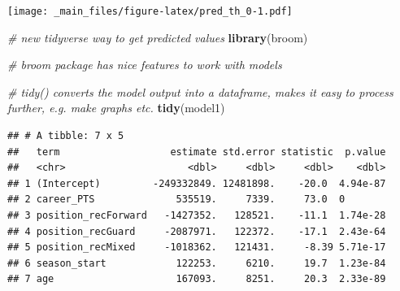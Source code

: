 \documentclass[
]{book}
\newenvironment{Shaded}{\begin{snugshade}}{\end{snugshade}}
\newcommand{\AttributeTok}[1]{\textcolor[rgb]{0.13,0.29,0.53}{#1}}
\newcommand{\CommentTok}[1]{\textcolor[rgb]{0.56,0.35,0.01}{\textit{#1}}}
\newcommand{\FunctionTok}[1]{\textcolor[rgb]{0.13,0.29,0.53}{\textbf{#1}}}
\newcommand{\NormalTok}[1]{#1}
\newcommand{\OtherTok}[1]{\textcolor[rgb]{0.56,0.35,0.01}{#1}}
\newcommand{\SpecialCharTok}[1]{\textcolor[rgb]{0.81,0.36,0.00}{\textbf{#1}}}
\newcommand{\StringTok}[1]{\textcolor[rgb]{0.31,0.60,0.02}{#1}}
\begin{document}
\begin{Shaded}
\end{Shaded}

\texttt{[image: \_main\_files/figure-latex/pred\_th\_0-1.pdf]}

\begin{Shaded}
\begin{Highlighting}[]
\CommentTok{\# new tidyverse way to get predicted values}
\FunctionTok{library}\NormalTok{(broom)}

\CommentTok{\# broom package has nice features to work with models}

\CommentTok{\# tidy() converts the model output into a dataframe, makes it easy to process further, e.g. make graphs etc.}
\FunctionTok{tidy}\NormalTok{(model1)}
\end{Highlighting}
\end{Shaded}

\begin{verbatim}
## # A tibble: 7 x 5
##   term                   estimate std.error statistic  p.value
##   <chr>                     <dbl>     <dbl>     <dbl>    <dbl>
## 1 (Intercept)         -249332849. 12481898.    -20.0  4.94e-87
## 2 career_PTS              535519.     7339.     73.0  0       
## 3 position_recForward   -1427352.   128521.    -11.1  1.74e-28
## 4 position_recGuard     -2087971.   122372.    -17.1  2.43e-64
## 5 position_recMixed     -1018362.   121431.     -8.39 5.71e-17
## 6 season_start            122253.     6210.     19.7  1.23e-84
## 7 age                     167093.     8251.     20.3  2.33e-89
\end{verbatim}
\end{document}

